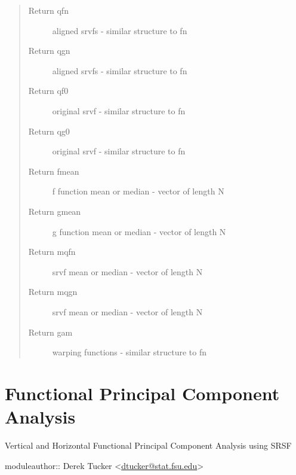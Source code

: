 \documentclass[letterpaper,10pt,english]{sphinxmanual}
\begin{document}
\begin{fulllineitems}
\begin{quote}
\begin{description}
\item[{Return qfn}] \leavevmode
aligned srvfs - similar structure to fn

\item[{Return qgn}] \leavevmode
aligned srvfs - similar structure to fn

\item[{Return qf0}] \leavevmode
original srvf - similar structure to fn

\item[{Return qg0}] \leavevmode
original srvf - similar structure to fn

\item[{Return fmean}] \leavevmode
f function mean or median - vector of length N

\item[{Return gmean}] \leavevmode
g function mean or median - vector of length N

\item[{Return mqfn}] \leavevmode
srvf mean or median - vector of length N

\item[{Return mqgn}] \leavevmode
srvf mean or median - vector of length N

\item[{Return gam}] \leavevmode
warping functions - similar structure to fn

\end{description}\end{quote}

\end{fulllineitems}



\chapter{Functional Principal Component Analysis}
\label{fPCA:module-fPCA}\label{fPCA::doc}\label{fPCA:functional-principal-component-analysis}
Vertical and Horizontal Functional Principal Component Analysis using SRSF

moduleauthor:: Derek Tucker \textless{}\href{mailto:dtucker@stat.fsu.edu}{dtucker@stat.fsu.edu}\textgreater{}
\end{document}
